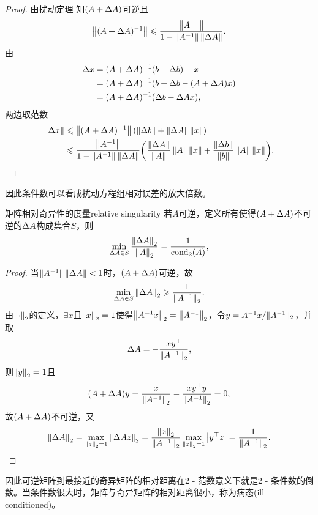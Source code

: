 \begin{proof}
    由扰动定理 知$(A+\D A)$可逆且
    \begin{equation}
        \norm{(A+\D A)\iv}\leq\frac{\norm{A\iv}}{1-\norm{A\iv}\norm{\D A}}.
    \end{equation}
    由
    \begin{align*}
        \D x&=(A+\D A)\iv(b+\D b)-x\\
        &=(A+\D A)\iv(b+\D b-(A+\D A)x)\\
        &=(A+\D A)\iv(\D b-\D Ax),
    \end{align*}
    两边取范数
    \begin{align*}
        \norm{\D x}&\leq\norm{(A+\D A)\iv}(\norm{\D b}+\norm{\D A}\norm x)\\
        &\leq\frac{\norm{A\iv}}{1-\norm{A\iv}\norm{\D A}}\biggkh{\frac{\norm{\D A}}{\norm A}\norm A\norm x+\frac{\norm{\D b}}{\norm b}\norm A\norm x}.
        \qedhere
    \end{align*}
\end{proof}

\begin{remark}
    因此条件数可以看成扰动方程组相对误差的放大倍数。
\end{remark}

\begin{theorem}
    {矩阵相对奇异性的度量}{relative singularity}
    若$A$可逆，定义所有使得$(A+\D A)$不可逆的$\D A$构成集合$S$，则 
    \begin{equation}
        \min_{\D A\in S}\frac{\norm{\D A}_2}{\norm A_2}=\frac1{\cond_2(A)},
    \end{equation}
\end{theorem}

\begin{proof}
    当$\nnorm{A\iv}\norm{\D A}<1$时，$(A+\D A)$可逆，故
    \[
        \min_{\D A\in S}\norm{\D A}_2\geq\frac1{\norm{A\iv}_2}.
    \]
    由$\norm\cdot_2$的定义，$\exists x$且$\norm x_2=1$使得$\norm{A\iv x}_2=\norm{A\iv}_2$，令$y=A\iv x/\nnorm{A\iv}_2$，并取
    \[
        \D A=-\frac{xy\tp}{\norm{A\iv}_2},
    \]
    则$\norm y_2=1$且
    \[
        (A+\D A)y=\frac{x}{\norm{A\iv}_2}-\frac{xy\tp y}{\norm{A\iv}_2}=0,
    \]
    故$(A+\D A)$不可逆，又
    \[
        \norm{\D A}_2=\max_{\norm z_2=1}\norm{\D Az}_2=\frac{\norm x_2}{\norm{A\iv}_2}\max_{\norm z_2=1}\abs{y\tp z}=\frac1{\norm{A\iv}_2}.
        \qedhere
    \]
\end{proof}

\begin{remark}
    因此可逆矩阵到最接近的奇异矩阵的相对距离在2 - 范数意义下就是2 - 条件数的倒数。当条件数很大时，矩阵与奇异矩阵的相对距离很小，称为病态(ill conditioned)。
\end{remark}

